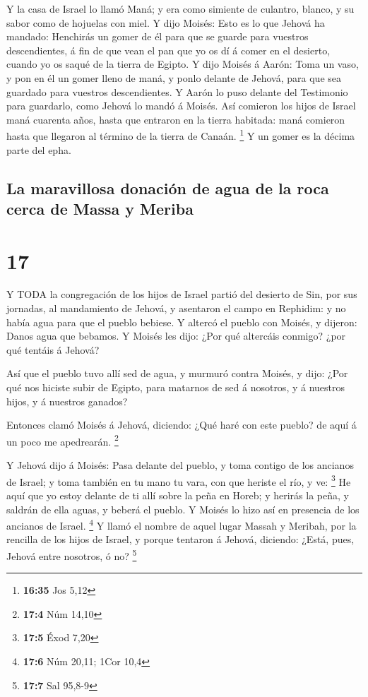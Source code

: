  Y la casa de Israel lo llamó Maná; y era como simiente de
culantro, blanco, y su sabor como de hojuelas con miel.  Y
dijo Moisés: Esto es lo que Jehová ha mandado: Henchirás un gomer de él
para que se guarde para vuestros descendientes, á fin de que vean el pan
que yo os dí á comer en el desierto, cuando yo os saqué de la tierra de
Egipto.  Y dijo Moisés á Aarón: Toma un vaso, y pon en él
un gomer lleno de maná, y ponlo delante de Jehová, para que sea guardado
para vuestros descendientes.  Y Aarón lo puso delante del
Testimonio para guardarlo, como Jehová lo mandó á Moisés. 
Así comieron los hijos de Israel maná cuarenta años, hasta que entraron
en la tierra habitada: maná comieron hasta que llegaron al término de la
tierra de Canaán. \footnote{\textbf{16:35} Jos 5,12}  Y un
gomer es la décima parte del epha.

\hypertarget{la-maravillosa-donaciuxf3n-de-agua-de-la-roca-cerca-de-massa-y-meriba}{%
\subsection{La maravillosa donación de agua de la roca cerca de Massa y
Meriba}\label{la-maravillosa-donaciuxf3n-de-agua-de-la-roca-cerca-de-massa-y-meriba}}

\hypertarget{section-16}{%
\section{17}\label{section-16}}

 Y TODA la congregación de los hijos de Israel partió del
desierto de Sin, por sus jornadas, al mandamiento de Jehová, y asentaron
el campo en Rephidim: y no había agua para que el pueblo bebiese.
 Y altercó el pueblo con Moisés, y dijeron: Danos agua que
bebamos. Y Moisés les dijo: ¿Por qué altercáis conmigo? ¿por qué tentáis
á Jehová?

 Así que el pueblo tuvo allí sed de agua, y murmuró contra
Moisés, y dijo: ¿Por qué nos hiciste subir de Egipto, para matarnos de
sed á nosotros, y á nuestros hijos, y á nuestros ganados?

 Entonces clamó Moisés á Jehová, diciendo: ¿Qué haré con
este pueblo? de aquí á un poco me apedrearán. \footnote{\textbf{17:4}
  Núm 14,10}

 Y Jehová dijo á Moisés: Pasa delante del pueblo, y toma
contigo de los ancianos de Israel; y toma también en tu mano tu vara,
con que heriste el río, y ve: \footnote{\textbf{17:5} Éxod 7,20}
 He aquí que yo estoy delante de ti allí sobre la peña en
Horeb; y herirás la peña, y saldrán de ella aguas, y beberá el pueblo. Y
Moisés lo hizo así en presencia de los ancianos de Israel. \footnote{\textbf{17:6}
  Núm 20,11; 1Cor 10,4}  Y llamó el nombre de aquel lugar
Massah y Meribah, por la rencilla de los hijos de Israel, y porque
tentaron á Jehová, diciendo: ¿Está, pues, Jehová entre nosotros, ó no?
\footnote{\textbf{17:7} Sal 95,8-9}

